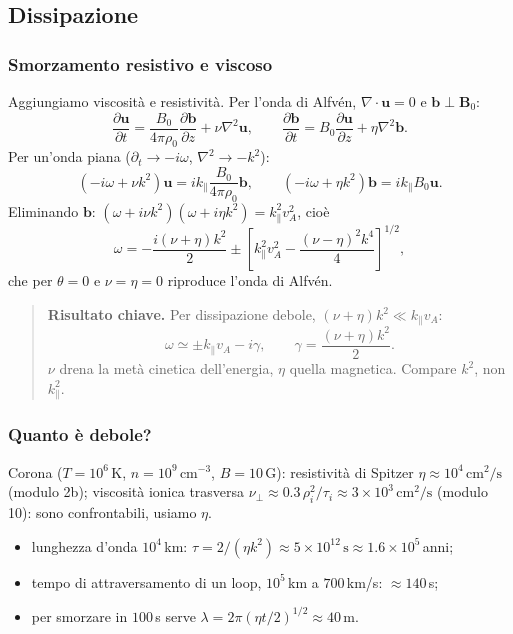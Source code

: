 \subsection{Dissipazione}

\subsubsection{Smorzamento resistivo e viscoso}

Aggiungiamo viscosità e resistività. Per l'onda di Alfvén, $\nabla\cdot\mathbf{u}=0$ e $\mathbf{b}\perp\mathbf{B}_0$:
\begin{equation}
\frac{\partial\mathbf{u}}{\partial t}=\frac{B_0}{4\pi\rho_0}\frac{\partial\mathbf{b}}{\partial z}+\nu\nabla^2\mathbf{u},\qquad
\frac{\partial\mathbf{b}}{\partial t}=B_0\frac{\partial\mathbf{u}}{\partial z}+\eta\nabla^2\mathbf{b}.
\end{equation}
Per un'onda piana ($\partial_t\to-i\omega$, $\nabla^2\to-k^2$):
\begin{equation}
(-i\omega+\nu k^2)\mathbf{u}=ik_\parallel\frac{B_0}{4\pi\rho_0}\mathbf{b},\qquad(-i\omega+\eta k^2)\mathbf{b}=ik_\parallel B_0\mathbf{u}.
\end{equation}
Eliminando $\mathbf{b}$: $(\omega+i\nu k^2)(\omega+i\eta k^2)=k_\parallel^2v_A^2$, cioè
\begin{equation}
\omega=-\frac{i(\nu+\eta)k^2}{2}\pm\left[k_\parallel^2v_A^2-\frac{(\nu-\eta)^2k^4}{4}\right]^{1/2},
\end{equation}
che per $\theta=0$ e $\nu=\eta=0$ riproduce l'onda di Alfvén.

\begin{quote}
\textbf{Risultato chiave.} Per dissipazione debole, $(\nu+\eta)k^2\ll k_\parallel v_A$:
\[
\omega\simeq\pm k_\parallel v_A-i\gamma,\qquad\gamma=\frac{(\nu+\eta)k^2}{2}.
\]
$\nu$ drena la metà cinetica dell'energia, $\eta$ quella magnetica. Compare $k^2$, non $k_\parallel^2$.
\end{quote}

\subsubsection{Quanto è debole?}

Corona ($T=10^6\,$K, $n=10^9\,\mathrm{cm^{-3}}$, $B=10\,$G): resistività di Spitzer $\eta\approx10^4\,\mathrm{cm^2/s}$ (modulo 2b); viscosità ionica trasversa $\nu_\perp\approx0.3\,\rho_i^2/\tau_i\approx3\times10^3\,\mathrm{cm^2/s}$ (modulo 10): sono confrontabili, usiamo $\eta$.
\begin{itemize}
\item lunghezza d'onda $10^4\,$km: $\tau=2/(\eta k^2)\approx5\times10^{12}\,\mathrm{s}\approx1.6\times10^5\,$anni;
\item tempo di attraversamento di un loop, $10^5\,$km a $700\,$km/s: $\approx140\,$s;
\item per smorzare in $100\,$s serve $\lambda=2\pi(\eta t/2)^{1/2}\approx40\,$m.
\end{itemize}

